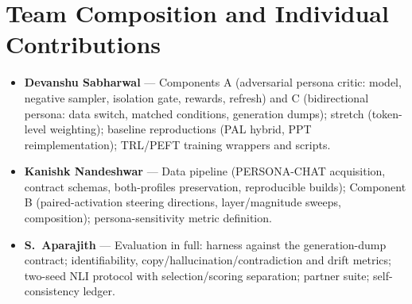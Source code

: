 \documentclass[lettersize,journal]{IEEEtran}
\begin{document}
\section*{Team Composition and Individual Contributions}
\begin{itemize}
\item \textbf{Devanshu Sabharwal} --- Components A (adversarial persona critic:
model, negative sampler, isolation gate, rewards, refresh) and C
(bidirectional persona: data switch, matched conditions, generation dumps);
stretch (token-level weighting); baseline reproductions (PAL hybrid, PPT
reimplementation); TRL/PEFT training wrappers and scripts.
\item \textbf{Kanishk Nandeshwar} --- Data pipeline (PERSONA-CHAT acquisition,
contract schemas, both-profiles preservation, reproducible builds); Component B
(paired-activation steering directions, layer/magnitude sweeps, composition);
persona-sensitivity metric definition.
\item \textbf{S.~Aparajith} --- Evaluation in full: harness against the
generation-dump contract; identifiability, copy/hallucination/contradiction and
drift metrics; two-seed NLI protocol with selection/scoring separation; partner
suite; self-consistency ledger.
\end{itemize}



\end{document}
